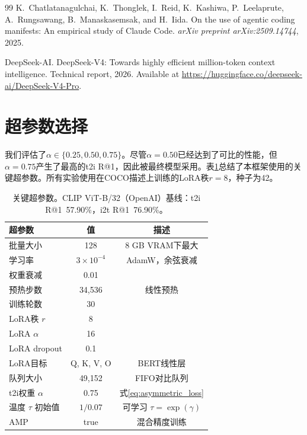 \documentclass[10pt,a4paper]{ctexart}
\begin{document}
\begin{thebibliography}{99}
K.~Chatlatanagulchai, K.~Thonglek, I.~Reid, K.~Kashiwa, P.~Leelaprute, A.~Rungsawang, B.~Manaskasemsak, and H.~Iida.
\newblock On the use of agentic coding manifests: An empirical study of Claude Code.
\newblock \textit{arXiv preprint arXiv:2509.14744}, 2025.

DeepSeek-AI.
\newblock DeepSeek-V4: Towards highly efficient million-token context intelligence.
\newblock Technical report, 2026.
\newblock Available at \url{https://huggingface.co/deepseek-ai/DeepSeek-V4-Pro}.

\end{thebibliography}

\section{超参数选择}

我们评估了$\alpha \in \{0.25, 0.50, 0.75\}$。尽管$\alpha{=}0.50$已经达到了可比的性能，但$\alpha{=}0.75$产生了最高的t2i R@1，因此被最终模型采用。表\ref{tab:hyperparams}总结了本框架使用的关键超参数。所有实验使用在COCO描述上训练的LoRA秩$r=8$，种子为42。

\begin{table}[h]
\centering
\caption{关键超参数。CLIP ViT-B/32（OpenAI）基线：t2i R@1~57.90\%，i2t R@1~76.90\%。}
\label{tab:hyperparams}
\begin{tabular}{lcc}
\toprule
超参数 & 值 & 描述 \\
\midrule
批量大小 & 128 & 8 GB VRAM下最大 \\
学习率 & $3\times10^{-4}$ & AdamW，余弦衰减 \\
权重衰减 & 0.01 & \\
预热步数 & 34,536 & 线性预热 \\
训练轮数 & 30 & \\
\midrule
LoRA秩 $r$ & 8 & \\
LoRA $\alpha$ & 16 & \\
LoRA dropout & 0.1 & \\
LoRA目标 & Q, K, V, O & BERT线性层 \\
\midrule
队列大小 & 49,152 & FIFO对比队列 \\
t2i权重 $\alpha$ & 0.75 & 式\ref{eq:asymmetric_loss} \\
温度 $\tau$ 初始值 & $1/0.07$ & 可学习 $\tau=\exp(\gamma)$ \\
\midrule
AMP & true & 混合精度训练 \\
\bottomrule
\end{tabular}
\end{table}
\end{document}
